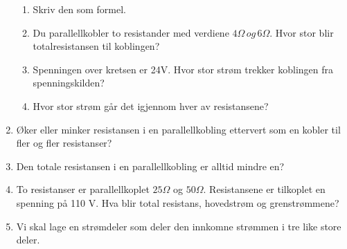\documentclass[12pt,a4paper]{article}
\begin{document}
\begin{enumerate}
\begin{enumerate}
\item Skriv den som formel.
\\
\item Du parallellkobler to resistander med verdiene $4\Omega\,og\,6\Omega$. Hvor stor blir totalresistansen til koblingen?
\\
\item Spenningen over kretsen er 24V. Hvor stor strøm trekker koblingen fra spenningskilden?
\\
\item Hvor stor strøm går det igjennom hver av resistansene?
\\
\end{enumerate}
\item Øker eller minker resistansen i en parallellkobling ettervert som en kobler til fler og fler resistanser?
\\
\item Den totale resistansen i en parallellkobling er alltid mindre en?
\\
\item To resistanser er parallellkoplet $25\Omega$ og $50\Omega$. Resistansene er tilkoplet en spenning på 110 V. Hva blir total resistans, hovedstrøm og grenstrømmene?
\\
\item Vi skal lage en strømdeler som deler den innkomne strømmen i tre like store deler.
\\


\end{enumerate}
\end{document}
